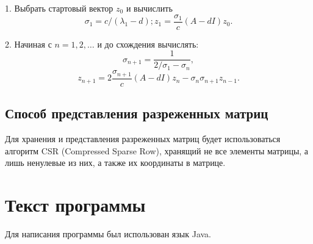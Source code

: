 \documentclass[12pt]{article}
\begin{document}
	1. Выбрать стартовый вектор $z_0$ и вычислить
	$$\sigma_1 = c / (\lambda_1 - d); z_1 = \frac{\sigma_1}{c} (A - dI) z_0.$$
	
	2. Начиная с $n=1,2, \dots$ и до схождения вычислять:
	$$\sigma_{n+1} = \frac{1}{2 / \sigma_1 - \sigma_n},$$
	$$z_{n+1} = 2 \frac{\sigma_{n+1}}{c} (A - dI) z_n - \sigma_n \sigma_{n+1} z_{n-1}.$$
	
	\bigskip
	{
		\subsection{Способ представления разреженных матриц}
	}
	
	Для хранения и представления разреженных матриц будет использоваться алгоритм CSR (Compressed Sparse Row), хранящий не все элементы матрицы, а лишь ненулевые из них, а также их координаты в матрице.
	
	
    \bigskip
    
    {
        \section{Текст программы}
    }
    
    Для написания программы был использован язык Java.
    
\end{document}
